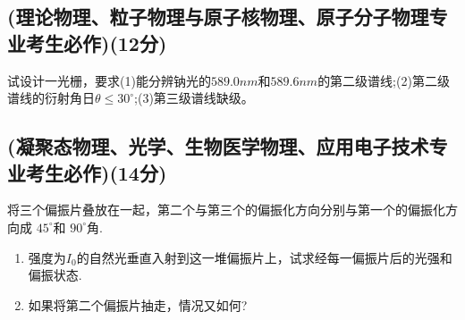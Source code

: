 \subsection{(理论物理、粒子物理与原子核物理、原子分子物理专业考生必作)(12分)}
试设计一光栅，要求(1)能分辨钠光的$589.0nm$和$589.6nm$的第二级谱线;(2)第二级谱线的衍射角日$\theta \leq 30^\circ$;(3)第三级谱线缺级。
\subsection{(凝聚态物理、光学、生物医学物理、应用电子技术专业考生必作)(14分)}
将三个偏振片叠放在一起，第二个与第三个的偏振化方向分别与第一个的偏振化方向成 $45^\circ$和 $90^\circ$角.
\begin{enumerate}
\item 强度为$I_0$的自然光垂直入射到这一堆偏振片上，试求经每一偏振片后的光强和偏振状态.
\item 如果将第二个偏振片抽走，情况又如何?
\end{enumerate}